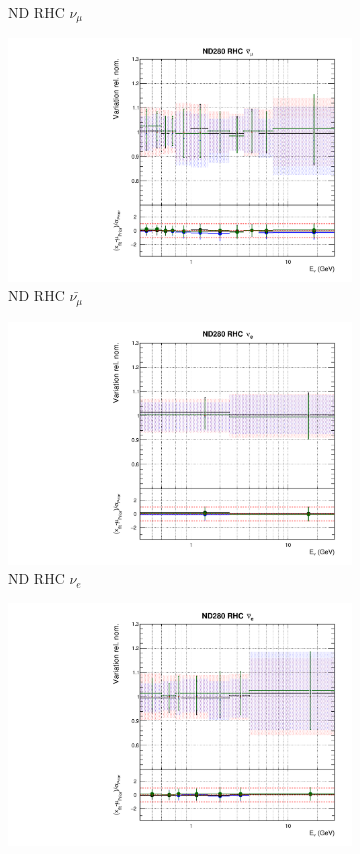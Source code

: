 \begin{figure}[t]
\begin{subfigure}{0.24\textwidth}
  \caption{ND RHC $\nu_{\mu}$}
\end{subfigure}
\begin{subfigure}{0.24\textwidth}
  \centering
  \includegraphics[width=0.95\linewidth]{figs/hptpcfitsflux_5}
  \caption{ND RHC $\bar{\nu_{\mu}}$}
\end{subfigure}
\begin{subfigure}{0.24\textwidth}
  \centering
  \includegraphics[width=0.95\linewidth]{figs/hptpcfitsflux_6}
  \caption{ND RHC $\nu_{e}$}
\end{subfigure}
\vspace{15mm}
\begin{subfigure}{0.24\textwidth}
  \centering
  \includegraphics[width=0.95\linewidth]{figs/hptpcfitsflux_7}

\end{subfigure}
\end{figure}
